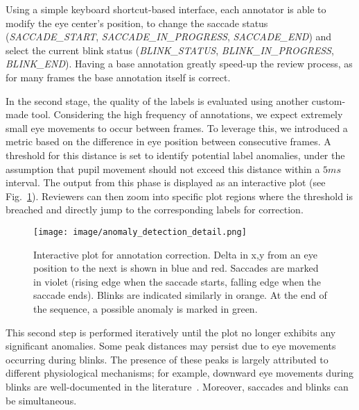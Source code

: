 Using a simple keyboard shortcut-based interface, each annotator is able to modify the eye center's position, to change the saccade status (\textit{SACCADE\_START}, \textit{SACCADE\_IN\_PROGRESS}, \textit{SACCADE\_END}) and select the current blink status (\textit{BLINK\_STATUS}, \textit{BLINK\_IN\_PROGRESS}, \textit{BLINK\_END}). Having a base annotation greatly speed-up the review process, as for many frames the base annotation itself is correct.

In the second stage, the quality of the labels is evaluated using another custom-made tool. Considering the high frequency of annotations, we expect extremely small eye movements to occur between frames. To leverage this, we introduced a metric based on the difference in eye position between consecutive frames. A threshold for this distance is set to identify potential label anomalies, under the assumption that pupil movement should not exceed this distance within a $5 ms$ interval. The output from this phase is displayed as an interactive plot (see Fig.~\ref{fig:anomaly_detection}). Reviewers can then zoom into specific plot regions where the threshold is breached and directly jump to the corresponding labels for correction.



\begin{figure}[t]
  \centering
  \texttt{[image: image/anomaly\_detection\_detail.png]}
  \caption{Interactive plot for annotation correction. Delta in x,y from an eye position to the next is shown in blue and red. Saccades are marked in violet (rising edge when the saccade starts, falling edge when the saccade ends). Blinks are indicated similarly in orange. At the end of the sequence, a possible anomaly is marked in green.}
  \label{fig:anomaly_detection}
\end{figure}


This second step is performed iteratively until the plot no longer exhibits any significant anomalies. Some peak distances may persist due to eye movements occurring during blinks. The presence of these peaks is largely attributed to different physiological mechanisms; for example, downward eye movements during blinks are well-documented in the literature~\cite{Khazali2017}. Moreover, saccades and blinks can be simultaneous.

